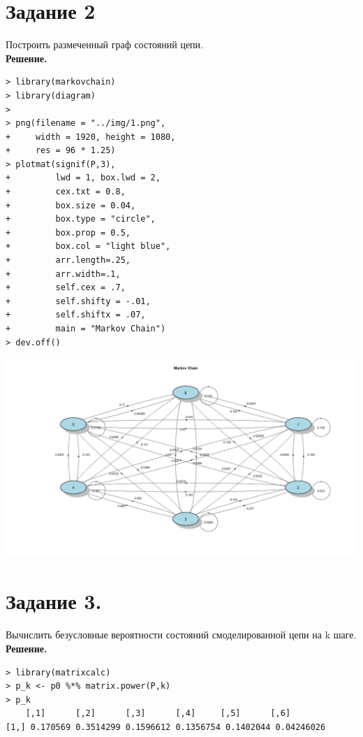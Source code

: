 \documentclass[14pt,a4paper]{scrartcl}
\begin{document}
\section*{Задание 2}
Построить размеченный граф состояний цепи.\\
\textbf{Решение.}\\

\begin{verbatim}
> library(markovchain)
> library(diagram)
> 
> png(filename = "../img/1.png",
+     width = 1920, height = 1080,
+     res = 96 * 1.25)
> plotmat(signif(P,3), 
+         lwd = 1, box.lwd = 2, 
+         cex.txt = 0.8, 
+         box.size = 0.04, 
+         box.type = "circle", 
+         box.prop = 0.5,
+         box.col = "light blue",
+         arr.length=.25,
+         arr.width=.1,
+         self.cex = .7,
+         self.shifty = -.01,
+         self.shiftx = .07,
+         main = "Markov Chain")
> dev.off()
\end{verbatim}

\includegraphics[angle=90,origin=t, scale=0.75]{../img/1.png}

\pagebreak

\section*{Задание 3.}
Вычислить безусловные вероятности состояний смоделированной цепи на k шаге.\\
\textbf{Решение.}\\

\begin{verbatim}
> library(matrixcalc)
> p_k <- p0 %*% matrix.power(P,k)
> p_k
	[,1]      [,2]      [,3]      [,4]     [,5]      [,6]
[1,] 0.170569 0.3514299 0.1596612 0.1356754 0.1402044 0.04246026
\end{verbatim}
\end{document}
